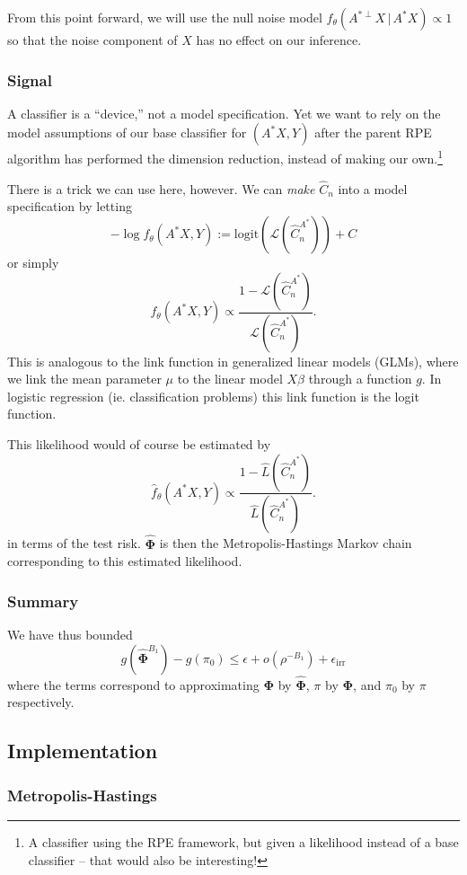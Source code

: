 \documentclass[ejs,preprint]{imsart}
\newcommand\risk{\mathcal{L}}
\begin{document}
From this point forward, we will use the null noise model $f_\theta(A^{*\perp} X \,|\,A^* X) \propto 1$ so that the noise component of $X$ has no effect on our inference.

\subsubsection{Signal}

A classifier is a ``device,'' not a model specification. Yet we want to rely on the model assumptions of our base classifier for $(A^*X,Y)$ after the parent RPE algorithm has performed the dimension reduction, instead of making our own.\footnote{A classifier using the RPE framework, but given a likelihood instead of a base classifier -- that would also be interesting!}

There is a trick we can use here, however. We can \emph{make} $\hat C_n$ into a model specification by letting
\[
-\log f_\theta(A^*X,Y) := \mathrm{logit}\left( \risk(\hat C_n^{A^*}) \right)+C
\]
or simply
\[
f_\theta(A^*X,Y) \propto \frac{1-\risk(\hat C_n^{A^*})}{\risk(\hat C_n^{A^*})}.
\]
This is analogous to the link function in generalized linear models (GLMs), where we link the mean parameter $\mu$ to the linear model $X\beta$ through a function $g$. In logistic regression (ie. classification problems) this link function is the logit function.

This likelihood would of course be estimated by
\[
\hat f_\theta(A^*X,Y) \propto \frac{1-\hat L(\hat C_n^{A^*})}{\hat L(\hat C_n^{A^*})}.
\]
in terms of the test risk. $\hat{\bm{\Phi}}$ is then the Metropolis-Hastings Markov chain corresponding to this estimated likelihood.

\subsubsection{Summary}

We have thus bounded 
\[
g(\hat{\bm{\Phi}}^{B_1})-g(\pi_0) \leq \epsilon + o(\rho^{-B_1}) + \epsilon_\mathrm{irr}
\]
where the terms correspond to approximating $\bm{\Phi}$ by $\hat{\bm{\Phi}}$, $\pi$ by $\bm{\Phi}$, and $\pi_0$ by $\pi$ respectively.

\subsection{Implementation}

\subsubsection{Metropolis-Hastings}
\end{document}
